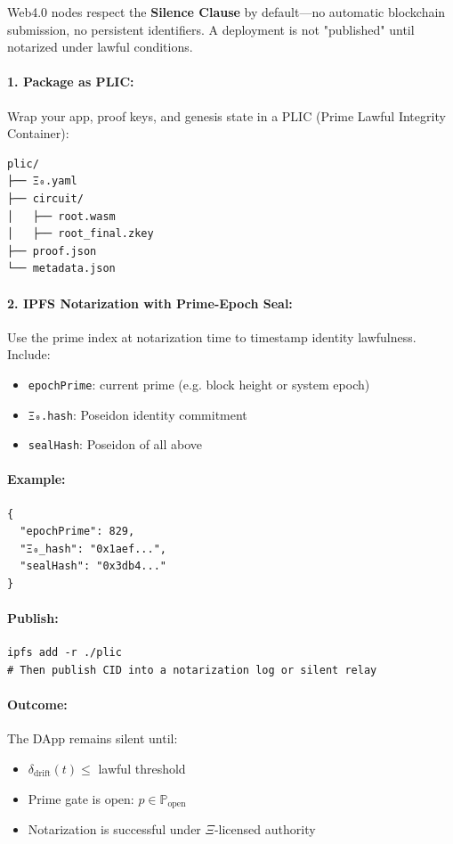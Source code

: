 \documentclass[12]{amsart}
\theoremstyle{plain}
\begin{document}
Web4.0 nodes respect the \textbf{Silence Clause} by default—no automatic blockchain submission, no persistent identifiers. A deployment is not "published" until notarized under lawful conditions.

\paragraph{1. Package as PLIC:}
Wrap your app, proof keys, and genesis state in a PLIC (Prime Lawful Integrity Container):

\begin{verbatim}
plic/
├── Ξ₀.yaml
├── circuit/
│   ├── root.wasm
│   ├── root_final.zkey
├── proof.json
└── metadata.json
\end{verbatim}

\paragraph{2. IPFS Notarization with Prime-Epoch Seal:}

Use the prime index at notarization time to timestamp identity lawfulness. Include:
\begin{itemize}
  \item \texttt{epochPrime}: current prime (e.g. block height or system epoch)
  \item \texttt{Ξ₀.hash}: Poseidon identity commitment
  \item \texttt{sealHash}: Poseidon of all above
\end{itemize}

\paragraph{Example:}
\begin{verbatim}
{
  "epochPrime": 829,
  "Ξ₀_hash": "0x1aef...",
  "sealHash": "0x3db4..."
}
\end{verbatim}

\paragraph{Publish:}
\begin{verbatim}
ipfs add -r ./plic
# Then publish CID into a notarization log or silent relay
\end{verbatim}

\paragraph{Outcome:}
The DApp remains silent until:
\begin{itemize}
  \item $\delta_{\text{drift}}(t) \leq$ lawful threshold
  \item Prime gate is open: $p \in \mathbb{P}_{\text{open}}$
  \item Notarization is successful under $\Xi$-licensed authority
\end{itemize}
\end{document}
